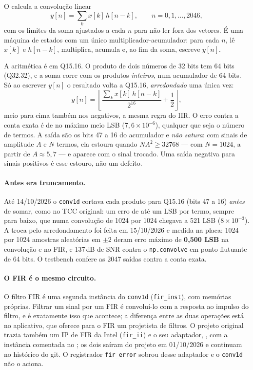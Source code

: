 O  calcula a convolução linear
\[
  y[n] = \sum_{k} x[k]\,h[n-k], \qquad n = 0, 1, \dots, 2046,
\]
com os limites da soma ajustados a cada \(n\) para não ler fora dos vetores. É
uma máquina de estados com um único multiplicador-acumulador: para cada \(n\),
lê \(x[k]\) e \(h[n-k]\), multiplica, acumula e, ao fim da soma, escreve
\(y[n]\).

A aritmética é em Q15.16. O produto de dois números de 32 bits tem 64 bits
(Q32.32), e a soma corre com os produtos \emph{inteiros}, num acumulador de 64
bits. Só ao escrever \(y[n]\) o resultado volta a Q15.16, \emph{arredondado}
uma única vez:
\[
  y[n] = \left\lfloor \frac{\textstyle\sum_k x[k]\,h[n-k]}{2^{16}} + \frac12
  \right\rfloor ,
\]
meio para cima também nos negativos, a mesma regra do IIR. O erro contra a
conta exata é de no máximo meio LSB (\(7{,}6\times10^{-6}\)), qualquer que seja
o número de termos. A saída são os bits 47 a 16 do acumulador e \emph{não
satura}: com sinais de amplitude \(A\) e \(N\) termos, ela estoura quando
\(N A^2 \ge 32768\) --- com \(N = 1024\), a partir de \(A \approx 5{,}7\) --- e
aparece com o sinal trocado. Uma saída negativa para sinais positivos é esse
estouro, não um defeito.

\paragraph{Antes era truncamento.} Até 14/10/2026 o \texttt{conv1d} cortava
cada produto para Q15.16 (bits 47 a 16) \emph{antes} de somar, como no TCC
original: um erro de até um LSB por termo, sempre para baixo, que numa
convolução de 1024 por 1024 chegava a 521 LSB (\(8\times10^{-3}\)). A troca pelo
arredondamento foi feita em 15/10/2026 e medida na placa: 1024 por 1024
amostras aleatórias em \(\pm 2\) deram erro máximo de \textbf{0,500 LSB} na
convolução e no FIR, e 137\,dB de SNR contra o \texttt{np.convolve} em ponto
flutuante de 64 bits. O testbench 
confere as 2047 saídas contra a conta exata.

\paragraph{O FIR é o mesmo circuito.} O filtro FIR é uma segunda instância do
\texttt{conv1d} (\texttt{fir\_inst}), com memórias próprias. Filtrar um sinal
por um FIR é convoluí-lo com a resposta ao impulso do filtro, e é exatamente
isso que acontece; a diferença entre as duas operações está no aplicativo, que
oferece para o FIR um projetista de filtros. O projeto original trazia também
um IP de FIR da Intel (\texttt{fir\_ii}) e o seu adaptador,
, com a instância comentada no ; os dois
saíram do projeto em 01/10/2026 e continuam no histórico do git. O
registrador \texttt{fir\_error} sobrou desse adaptador e o \texttt{conv1d} não
o aciona.

